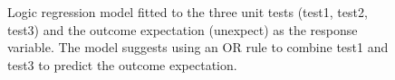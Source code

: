 \documentclass[
  12pt,
]{interact}
\begin{document}
\label{cell-fig-logic-reg}
\begin{figure}[H]


\caption{\label{fig-logic-reg}Logic regression model fitted to the three
unit tests (test1, test2, test3) and the outcome expectation (unexpect)
as the response variable. The model suggests using an OR rule to combine
test1 and test3 to predict the outcome expectation.}

\end{figure}%
\end{document}
